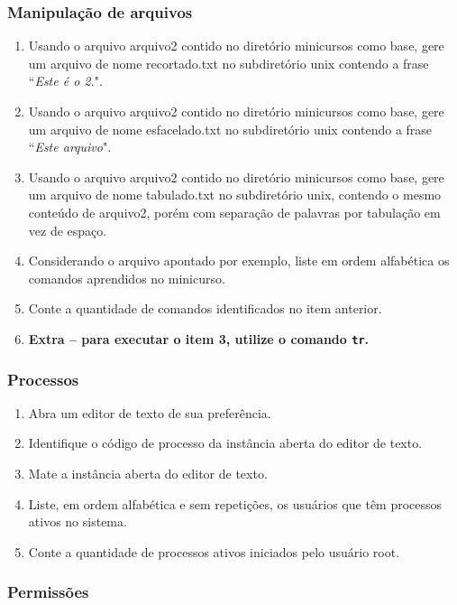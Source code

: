 \documentclass[a4paper,10pt,titlepage,twosided]{book}
\begin{document}
\subsubsection{Manipulação de arquivos}

\begin{enumerate}
\medskip
\item Usando o arquivo \textsf{arquivo2} contido no diretório \textsf{minicursos} como base, gere um arquivo de nome \textsf{recortado.txt} no subdiretório \textsf{unix} contendo a frase ``\emph{Este é o 2.}".
\item Usando o arquivo \textsf{arquivo2} contido no diretório \textsf{minicursos} como base, gere um arquivo de nome \textsf{esfacelado.txt} no subdiretório \textsf{unix} contendo a frase ``\emph{Este arquivo}".
\item Usando o arquivo \textsf{arquivo2} contido no diretório \textsf{minicursos} como base, gere um arquivo de nome \textsf{tabulado.txt} no subdiretório \textsf{unix}, contendo o mesmo conteúdo de \textsf{arquivo2}, porém com separação de palavras por tabulação em vez de espaço.
\item Considerando o arquivo apontado por \textsf{exemplo}, liste em ordem alfabética os comandos aprendidos no minicurso.
\item Conte a quantidade de comandos identificados no item anterior.
\item[] \textbf{Extra -- para executar o item 3, utilize o comando \texttt{tr}.}
\end{enumerate}

\subsubsection{Processos}

\begin{enumerate}
\medskip
\item Abra um editor de texto de sua preferência.
\item Identifique o código de processo da instância aberta do editor de texto.
\item Mate a instância aberta do editor de texto.
\item Liste, em ordem alfabética e sem repetições, os usuários que têm processos ativos no sistema.
\item Conte a quantidade de processos ativos iniciados pelo usuário \textsf{root}.
\end{enumerate}

\subsubsection{Permissões}
\end{document}
